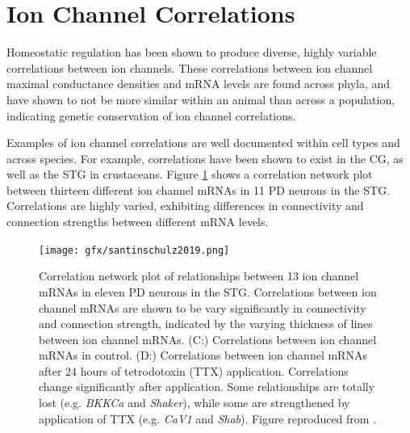 \section{Ion Channel Correlations}

Homeostatic regulation has been shown to produce diverse, highly variable correlations between ion channels\cite{schulz_variable_2006,schulz_quantitative_2007,golowasch_activity-dependent_1999}.
These correlations between ion channel maximal conductance densities and mRNA levels are found across phyla, and have shown to not be more similar within an animal than across a population, indicating genetic conservation of ion channel correlations\cite{tobin_correlations_2009,tran_ionic_2019}.

Examples of ion channel correlations are well documented within cell types and across species\cite{schulz_quantitative_2007,maclean_activity-independent_2003,santin_membrane_2019}. For example, correlations have been shown to exist in the \ac{CG}, as well as the \ac{STG} in crustaceans\cite{tobin_correlations_2009,baro_quantitative_1997,schulz_variable_2006,schulz_quantitative_2007}. 
Figure \ref{fig:santinschulz2019} shows a correlation network plot between thirteen different ion channel mRNAs in 11 \ac{PD} neurons in the \ac{STG}. Correlations are highly varied, exhibiting differences in connectivity and connection strengths between different mRNA levels.

\begin{figure}[h]
    \centering
    \texttt{[image: gfx/santinschulz2019.png]}
    \caption[Correlations between 13 ion channel mRNAs in PD neurons.]{Correlation network plot of relationships between 13 ion channel mRNAs in eleven \ac{PD} neurons in the \ac{STG}. Correlations between ion channel mRNAs are shown to be vary significantly in connectivity and connection strength, indicated by the varying thickness of lines between ion channel mRNAs. (\textsc{C:}) Correlations between ion channel mRNAs in control. (\textsc{D:}) Correlations between ion channel mRNAs after 24 hours of tetrodotoxin (TTX) application. Correlations change significantly after application. Some relationships are totally lost (e.g. \textit{BKKCa} and \textit{Shaker}), while some are strengthened by application of TTX (e.g. \textit{CaV1} and \textit{Shab}). Figure reproduced from \cite{santin_membrane_2019}.}
    \label{fig:santinschulz2019}
\end{figure}

